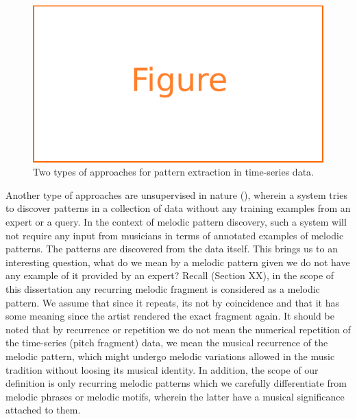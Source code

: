 \begin{figure}
	\begin{center}
		\includegraphics[width=\figSizeSixty]{ch06_patterns/figures/figure_todo.pdf}
	\end{center}
	\caption{Two types of approaches for pattern extraction in time-series data.}
	\label{fig:types_of_methodologies_for_extraction}
\end{figure}

Another type of approaches are unsupervised in nature (), wherein a system tries to discover patterns in a collection of data without any training examples from an expert or a query. In the context of melodic pattern discovery, such a system will not require any input from musicians in terms of annotated examples of melodic patterns. The patterns are discovered from the data itself. This brings us to an interesting question, what do we mean by a melodic pattern given we do not have any example of it provided by an expert? Recall (Section XX), in the scope of this dissertation any recurring melodic fragment is considered as a melodic pattern. We assume that since it repeats, its not by coincidence and that it has some meaning since the artist rendered the exact fragment again. It should be noted that by recurrence or repetition we do not mean the numerical repetition of the time-series (pitch fragment) data, we mean the musical recurrence of the melodic pattern, which might undergo melodic variations allowed in the music tradition without loosing its musical identity. In addition, the scope of our definition is only recurring melodic patterns which we carefully differentiate from melodic phrases or melodic motifs, wherein the latter have a musical significance attached to them.

